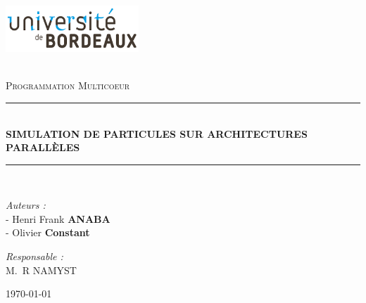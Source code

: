 \documentclass[a4paper,11pt]{report}
\newcommand{\reporttitle}{SIMULATION DE PARTICULES SUR ARCHITECTURES PARALLÈLES}     %
\newcommand{\reportauthor}{- Henri Frank \textbf{ANABA}\\ - Olivier \textbf{Constant}}%
\newcommand{\reportsubject}{Programmation Multicoeur} %
\begin{document}
\newcommand{\Aut}{\mathcal{A}}
\newcommand{\N}{\mathbb{N}}
\newcommand{\R}{\mathcal{R}}
\newcommand{\T}{\mathcal{T}}
\newcommand{\F}{\mathcal{F}}
\newcommand{\HRule}{\rule{\linewidth}{0.5mm}}

\begin{center}

\begin{minipage}[t]{0.48\textwidth}
  \begin{flushleft}
    \includegraphics [width=50mm]{images/index.png} \\[0.5cm]
  \end{flushleft}
\end{minipage}
\begin{minipage}[t]{0.48\textwidth}
  \begin{flushright}
  \end{flushright}
\end{minipage} \\[1.5cm]

\textsc{\Large \reportsubject}\\[0.5cm]
\HRule \\[0.4cm]
{\huge \bfseries \reporttitle}\\[0.4cm]
\HRule \\[1.5cm]

\vfill

\begin{minipage}[t]{0.6\textwidth}
  \begin{flushleft} \large
    \emph{Auteurs :}\\ 
    \reportauthor
  \end{flushleft}
\end{minipage}

\hfill
\vfill
\vfill
\vfill

\begin{minipage}[t]{0.6\textwidth}
  \begin{flushright} \large
    \emph{Responsable :} \\
    M.~R \textsc{NAMYST}\\
  \end{flushright}
\end{minipage}

\vfill

{\large \today}

\end{center}
\end{document}
